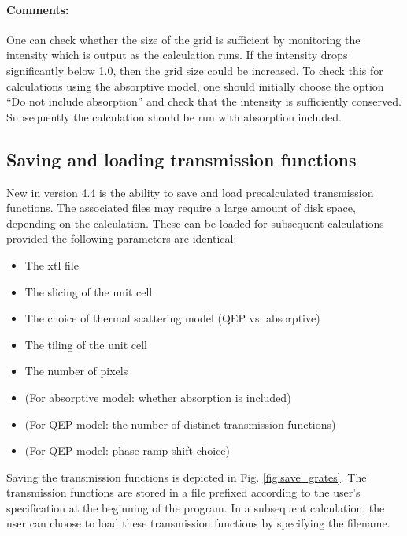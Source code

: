 \documentclass[12pt,a4paper]{article}
\begin{document}
\paragraph{Comments:}

One can check whether the size of the grid is sufficient by monitoring the intensity which is output as the calculation runs.
If the intensity drops significantly below 1.0, then the grid size could be increased.
To check this for calculations using the absorptive model, one should initially choose the option ``Do not include absorption'' and check that the intensity is sufficiently conserved.
Subsequently the calculation should be run with absorption included.


\subsection{Saving and loading transmission functions}

New in version 4.4 is the ability to save and load precalculated transmission functions.
The associated files may require a large amount of disk space, depending on the calculation.
These can be loaded for subsequent calculations provided the following parameters are identical:
%
\begin{itemize}
    \item The xtl file
    \item The slicing of the unit cell
    \item The choice of thermal scattering model (QEP vs. absorptive)
    \item The tiling of the unit cell
    \item The number of pixels
    \item (For absorptive model: whether absorption is included)
    \item (For QEP model: the number of distinct transmission functions)
    \item (For QEP model: phase ramp shift choice)
\end{itemize}
%
Saving the transmission functions is depicted in Fig. \ref{fig:save_grates}.
The transmission functions are stored in a file prefixed according to the user's specification at the beginning of the program.
In a subsequent calculation, the user can choose to load these transmission functions by specifying the filename.
\end{document}
